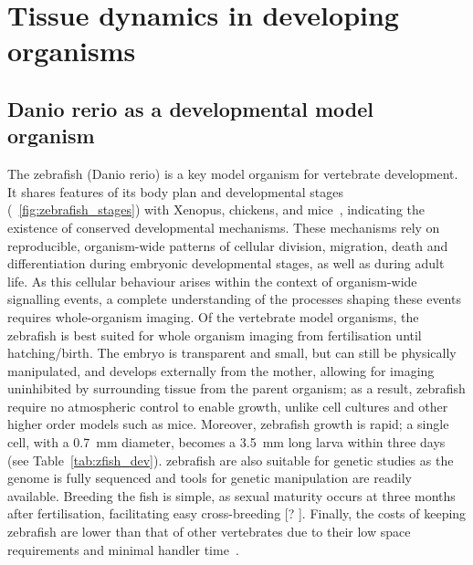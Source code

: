 
\section{Tissue dynamics in developing organisms}

\subsection{Danio rerio as a developmental model organism}
The \gls{zebrafish} (Danio rerio) is a key model organism for vertebrate development.
It shares features of its body plan and developmental stages (\figurename~\ref{fig:zebrafish_stages}) with Xenopus, chickens, and mice~\cite{wolpertPrinciplesDevelopment2006}, indicating the existence of conserved developmental mechanisms.
These mechanisms rely on reproducible, organism-wide patterns of cellular division, migration, death and differentiation during embryonic developmental stages, as well as during adult life.
As this cellular behaviour arises within the context of organism-wide signalling events, a complete understanding of the processes shaping these events requires whole-organism imaging.
Of the vertebrate model organisms, the \gls{zebrafish} is best suited for whole organism imaging from fertilisation until hatching/birth.
The embryo is transparent and small, but can still be physically manipulated, and develops externally from the mother, allowing for imaging uninhibited by surrounding tissue from the parent organism; as a result, \gls{zebrafish} require no atmospheric control to enable growth, unlike cell cultures and other higher order models such as mice.
Moreover, \gls{zebrafish} growth is rapid; a single cell, with a \SI{0.7}{\milli\meter} diameter, becomes a \SI{3.5}{\milli\meter} long larva within three days (see Table~\ref{tab:zfish_dev}).
\gls{zebrafish} are also suitable for genetic studies as the genome is fully sequenced and tools for genetic manipulation are readily available.
Breeding the fish is simple, as sexual maturity occurs at three months after fertilisation, facilitating easy cross-breeding [? ].
Finally, the costs of keeping \gls{zebrafish} are lower than that of other vertebrates due to their low space requirements and minimal handler time~\cite{AnimalModelsHuman}.

